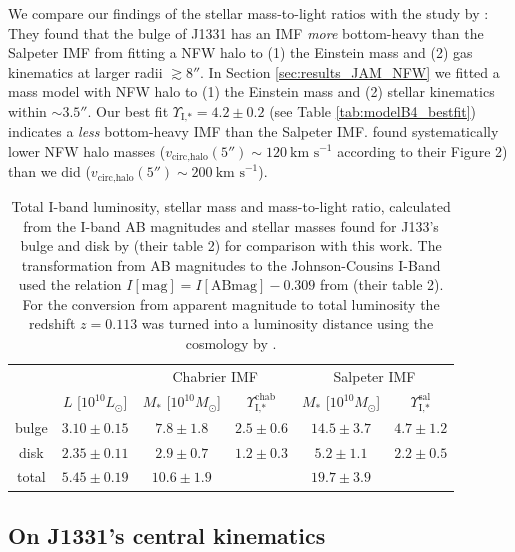 We compare our findings of the stellar mass-to-light ratios with the study by \cite{SWELLSV}: They found that the bulge of J1331 has an IMF \emph{more} bottom-heavy than the Salpeter IMF from fitting a NFW halo to (1) the Einstein mass and (2) gas kinematics at larger radii $\gtrsim 8''$. In Section \ref{sec:results_JAM_NFW} we fitted a mass model with NFW halo to (1) the Einstein mass and (2) stellar kinematics within $\sim 3.5''$. Our best fit $\Upsilon_\text{I,*} = 4.2 \pm 0.2$ (see Table \ref{tab:modelB4_bestfit}) indicates a \emph{less} bottom-heavy IMF than the Salpeter IMF. \cite{SWELLSV} found systematically lower NFW halo masses ($v_\text{circ,halo}(5'') \sim 120~\text{km s}^{-1}$ according to their Figure 2) than we did ($v_\text{circ,halo}(5'') \sim 200~\text{km s}^{-1}$).

\begin{table}
\centering
\begin{tabular}{cccccc}
\hline\hline
& & \multicolumn{2}{c}{Chabrier IMF} & \multicolumn{2}{c}{Salpeter IMF}\\
      &  $L$ [$10^{10}L_{\odot}$]                & $M_*$ [$10^{10}M_\odot$]               & $\Upsilon_\text{I,*}^\text{chab}$ & $M_*$ [$10^{10}M_\odot$] & $\Upsilon_\text{I,*}^\text{sal}$ \\\hline
bulge &   $3.10 \pm 0.15 $  & $7.8 \pm 1.8$ & $2.5 \pm 0.6$ & $14.5 \pm 3.7 $ & $4.7 \pm 1.2$ \\
disk  &   $2.35 \pm 0.11 $  & $2.9 \pm 0.7$ & $1.2 \pm 0.3$ & $5.2 \pm 1.1$ & $2.2 \pm 0.5$ \\
total &   $5.45 \pm 0.19$ & $10.6 \pm 1.9$& & $19.7 \pm 3.9$&\\\hline
\end{tabular}
\caption{Total I-band luminosity, stellar mass and mass-to-light ratio, calculated from the I-band AB magnitudes and stellar masses found for J133's bulge and disk by \citet{SWELLSI} (their table 2) for comparison with this work. The transformation from AB magnitudes to the Johnson-Cousins I-Band used the relation $I[\text{mag}] = I[\text{ABmag}] - 0.309$ from \citet{FG1994} (their table 2). For the conversion from apparent magnitude to total luminosity the redshift $z=0.113$ \citet{SWELLSIII} was turned into a luminosity distance using the cosmology by \citet{WMAP5cosm}. }
\label{tab:previousresults}
\end{table}

\subsection{On J1331's central kinematics}

